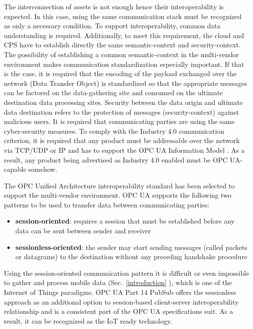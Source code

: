 \documentclass[runningheads]{llncs}
\begin{document}
The interconnection of assets is not enough hence their interoperability is expected. In this case, using the same communication stack must be recognized as only a necessary condition. To support interoperability, common data understanding is required. Additionally, to meet this requirement, the cloud and CPS have to establish directly the same semantic-context and security-context. The possibility of establishing a common semantic-context in the multi-vendor environment makes communication standardization especially important. If that is the case, it is required that the encoding of the payload exchanged over the network (Data Transfer Object) is standardized so that the appropriate messages can be factored on the data-gathering site and consumed on the ultimate destination data processing sites. Security between the data origin and ultimate data destination refers to the protection of messages (security-context) against malicious users. It is required that communicating parties are using the same cyber-security measures. To comply with the Industry 4.0 communication criterion, it is required that any product must be addressable over the network via TCP/UDP or IP and has to support the OPC UA Information Model \cite{OPCUAPart5, RefWorks:doc:5ac86c99e4b009947bbb87c9, RefWorks:doc:5d986a28e4b0b0c862c0d184}. As a result, any product being advertised as Industry 4.0 enabled must be OPC UA-capable somehow.

The OPC Unified Architecture interoperability standard has been selected to support the multi-vendor environment. OPC UA supports the following two patterns to be used to transfer data between communicating parties:

\begin{itemize}
      \item \textbf{session-oriented}: requires a session that must be established before any data can be sent between sender and receiver
      \item \textbf{sessionless-oriented}: the sender may start sending messages (called packets or datagrams) to the destination without any preceding handshake procedure
\end{itemize}

Using the session-oriented communication pattern it is difficult or even impossible to gather and process mobile data (Sec.~\ref{introduction} ), which is one of the Internet of Things paradigms. OPC UA Part 14 PubSub \cite{RefWorks:doc:5d98837de4b055984c0eecf0, UAPart14PubSubMainTechnologyFeatures} offers the sessionless approach as an additional option to session-based client-server interoperability relationship and is a consistent part of the OPC UA specifications suit. As a result, it can be recognized as the IoT ready technology.
\end{document}
